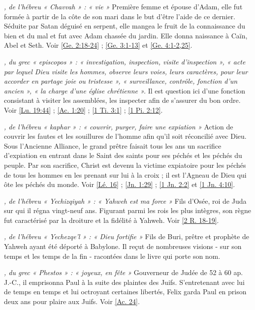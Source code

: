 \begin{multicols}{2}
\textit{, de l'hébreu « Chavvah » : « vie »}\newline
Première femme et épouse d'Adam, elle fut formée à partir de la côte de son mari dans le but d'être l'aide de ce dernier. Séduite par Satan déguisé en serpent, elle mangea le fruit de la connaissance du bien et du mal et fut avec Adam chassée du jardin. Elle donna naissance à Caïn, Abel et Seth. Voir \vref{Ge. 2:18-24} ; \vref{Ge. 3:1-13} et \vref{Ge. 4:1-2,25}.

\textit{, du grec « episcopos » : « investigation, inspection, visite d'inspection », « acte par lequel Dieu visite les hommes, observe leurs voies, leurs caractères, pour leur accorder en partage joie ou tristesse », « surveillance, contrôle, fonction d'un ancien », « la charge d'une église chrétienne ».}\newline
Il est question ici d'une fonction consistant à visiter les assemblées, les inspecter afin de s'assurer du bon ordre. Voir \vref{Lu. 19:44} ; \vref{Ac. 1:20} ; \vref{1 Ti. 3:1} ; \vref{1 Pi. 2:12}.

\textit{, de l'hébreu « kaphar » : « couvrir, purger, faire une expiation »}\newline
Action de couvrir les fautes et les souillures de l'homme afin qu'il soit réconcilié avec Dieu. Sous l'Ancienne Alliance, le grand prêtre faisait tous les ans un sacrifice d'expiation en entrant dans le Saint des saints pour ses péchés et les péchés du peuple. Par son sacrifice, Christ est devenu la victime expiatoire pour les péchés de tous les hommes en les prenant sur lui à la croix ; il est l'Agneau de Dieu qui ôte les péchés du monde. Voir \vref{Lé. 16} ; \vref{Jn. 1:29} ; \vref{1 Jn. 2:2} et \vref{1 Jn. 4:10}.

\textit{, de l'hébreu « Yechizqiyah » : « Yahweh est ma force »}\newline
Fils d'Osée, roi de Juda sur qui il régna vingt-neuf ans. Figurant parmi les rois les plus intègres, son règne fut caractérisé par la droiture et la fidélité à Yahweh. Voir \vref{2 R. 18-19}.

\textit{, de l'hébreu « Yechezqe'l » : « Dieu fortifie »}\newline
Fils de Buri, prêtre et prophète de Yahweh ayant été déporté à Babylone. Il reçut de nombreuses visions - sur son temps et les temps de la fin - racontées dans le livre qui porte son nom.

\textit{, du grec « Phestos » : « joyeux, en fête »}\newline
Gouverneur de Judée de 52 à 60 ap. J.-C., il emprisonna Paul à la suite des plaintes des Juifs. S'entretenant avec lui de temps en temps et lui octroyant certaines libertés, Felix garda Paul en prison deux ans pour plaire aux Juifs. Voir \vref{Ac. 24}.


\end{multicols}
